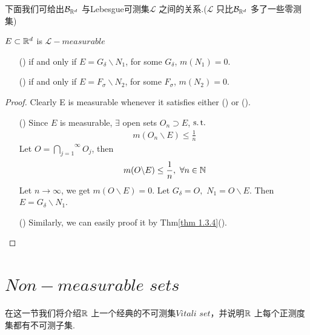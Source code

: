 	\vspace{2em}
	下面我们可给出$\mathcal{B}_{\mathbb{R}^d}$ 与Lebesgue可测集$\mathcal{L}$ 之间的关系.($\mathcal{L}$ 只比$\mathcal{B}_{\mathbb{R}^d}$ 多了一些零测集)
	\begin{thm}
		$E \subset \mathbb{R}^d$ is $\mathcal{L}-measurable$
		\begin{enumerate}
			\item[(\rmnum{1})]if and only if $E = G_\delta \backslash N_1$, for some $G_\delta$, $m(N_1) = 0$.
			
			\item[(\rmnum{2})]if and only if $E = F_\sigma \backslash N_2$, for some $F_\sigma$, $m(N_2) = 0$.
		\end{enumerate}
	
		\vspace{2em}
		\begin{proof}
			Clearly E is measurable whenever it satisfies either () or ().
			\begin{enumerate}
				\item[(\rmnum{1})]Since $E$ is measurable, $\exists$ open sets $O_n \supset E$, $\operatorname{s.t.}$
				\begin{align}
					m(O_n \backslash E) \leq \frac{1}{n}
				\end{align}
				Let $O = \overset{\infty}{\underset{j = 1}{\bigcap}}{O_j}$, then
				\begin{align}
					m(O \backslash E) \leq \frac{1}{n} , \,\, \forall n \in \mathbb{N}
				\end{align}
				Let $n \to \infty$, we get $m(O \backslash E) = 0$. Let $G_\delta = O , \,\, N_1 = O \backslash E$. Then $E = G_\delta \backslash N_1$.
				
				\item[()]Similarly, we can easily proof it by Thm\ref{thm 1.3.4}(\rmnum{2}).
			\end{enumerate}
		\end{proof}
	\end{thm}

\newpage
\section{$Non-measurable \,\, sets$}
	在这一节我们将介绍$\mathbb{R}$ 上一个经典的不可测集$Vitali \,\, set$，并说明$\mathbb{R}$ 上每个正测度集都有不可测子集.
